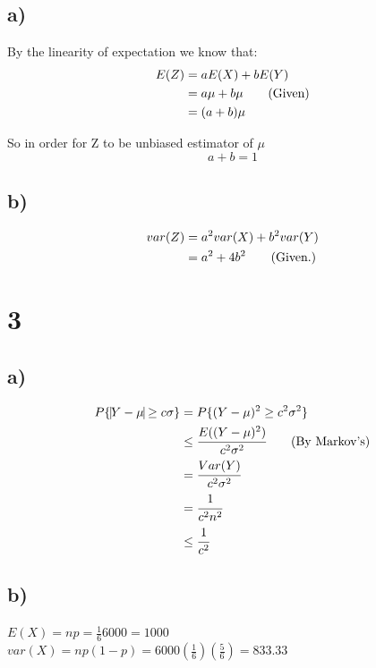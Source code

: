 \documentclass[11pt]{article}
\begin{document}
\subsection*{a)}
\label{sec:orgad2e7a2}

By the linearity of expectation we know that: 
\begin{align}
  E(Z) &= a E(X) + b E(Y) \notag\\
       &= a \mu + b \mu \tag{Given}\\
       &= (a + b) \mu \notag
\end{align}

So in order for Z to be unbiased estimator of \(\mu\) $$ a + b = 1$$


\subsection*{b)}
\label{sec:orgc220911}

\begin{align}
  var(Z) &= a^{2}var(X) + b^{2}var(Y) \notag \\
         &= a^{2} + 4b^{2} \tag{Given.} \\
\end{align}



\section*{3}
\label{sec:org3b334c7}
\subsection*{a)}
\label{sec:org1250f07}
\begin{align}
  P\{\vline Y - \mu \vline \geq c\sigma\} &= P\{( Y - \mu )^{2} \geq c^{2}\sigma^{2}\} \notag\\
  &\leq \cfrac{E((Y - \mu)^{2})}{c^{2}\sigma^{2}} \tag{By Markov's}\\
  &= \cfrac{Var(Y)}{c^{2}\sigma^{2}} \notag\\
  &= \cfrac{1}{c^{2}n^{2}} \notag\\
  &\leq \cfrac{1}{c^{2}} \notag\\
\end{align}

\subsection*{b)}
\label{sec:org72c6e77}

$E(X)  = np = \frac{1}{6}6000 = 1000$ \\
$var(X) = np(1-p) = 6000(\frac{1}{6})(\frac{5}{6}) = 833.33$\\
\end{document}
